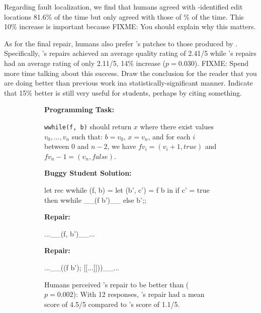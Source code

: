 Regarding fault localization, we find that humans agreed with \toolname-identified
edit locations 81.6\% of the time but only agreed with those of \%
of the time. This 10\% increase is important because
FIXME: You should explain why this matters.

As for the final repair, humans also prefer \toolname's patches
to those produced by \seminal. Specifically, \toolname's repairs achieved an
average quality rating of 2.41/5 while \seminal's repairs had an average rating
of only 2.11/5, 14\% increase ($p=0.030$).
FIXME: Spend more time talking about this success. Draw the conclusion
for the reader that you are doing better than previous work ina
statistically-significant manner. Indicate that 15\% better is still very
useful for students, perhaps by citing something.

\begin{figure}
\begin{subfigure}[t]{.38\textwidth}
\begin{center}
\textbf{Programming Task:}
\end{center}
\texttt{wwhile(f, b)} should return $x$ where
there exist values $v_0,...,v_n$ such that:
$b = v_0$, $x = v_n$, and
for each $i$ between 0 and $n-2$, we have $f v_i = (v_i+1, true)$
and $f v_n-1 = (v_n, false)$.
\begin{center}
\textbf{Buggy Student Solution:}
\end{center}
\begin{compactcode}
let rec wwhile (f, b) =
let (b', c') = f b in if c' = true
then wwhile __(f b')__ else b';;
\end{compactcode}
\begin{center}
\textbf{\toolname Repair:}
\end{center}
\begin{compactcode}
           ...__(f, b')__...
\end{compactcode}
\begin{center}
\textbf{\seminal Repair:}
\end{center}
\begin{compactcode}
     ...__((f b'); [[...]]))__...
\end{compactcode}
\caption{Humans perceived \toolname's repair to be
better than \seminal ($p=0.002$): With 12 responses, \toolname's
repair had a mean score of 4.5/5 compared to \seminal's
score of 1.1/5.}
\label{subfig:good1}
\end{subfigure}\hfill
\begin{subfigure}[t]{.1\textwidth}

\end{subfigure}
\end{figure}
